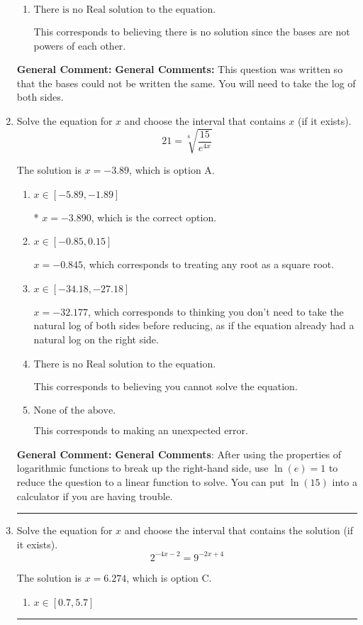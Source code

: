 \documentclass{extbook}[14pt]
\newcommand{\litem}[1]{\item #1

\rule{\textwidth}{0.4pt}}
\begin{document}
\begin{enumerate}
{\begin{enumerate}[label=\Alph*.]
$x = 0.811$, which corresponds to distributing the $\ln(base)$ to the first term of the exponent only.
\item \( \text{There is no Real solution to the equation.} \)

This corresponds to believing there is no solution since the bases are not powers of each other.
\end{enumerate}

\textbf{General Comment:} \textbf{General Comments:} This question was written so that the bases could not be written the same. You will need to take the log of both sides.
}
\litem{
 Solve the equation for $x$ and choose the interval that contains $x$ (if it exists).
\[  21 = \sqrt[6]{\frac{15}{e^{4x}}} \]

The solution is \( x = -3.89 \), which is option A.\begin{enumerate}[label=\Alph*.]
\item \( x \in [-5.89, -1.89] \)

* $x = -3.890$, which is the correct option.
\item \( x \in [-0.85, 0.15] \)

$x = -0.845$, which corresponds to treating any root as a square root.
\item \( x \in [-34.18, -27.18] \)

$x = -32.177$, which corresponds to thinking you don't need to take the natural log of both sides before reducing, as if the equation already had a natural log on the right side.
\item \( \text{There is no Real solution to the equation.} \)

This corresponds to believing you cannot solve the equation.
\item \( \text{None of the above.} \)

This corresponds to making an unexpected error.
\end{enumerate}

\textbf{General Comment:} \textbf{General Comments}: After using the properties of logarithmic functions to break up the right-hand side, use $\ln(e) = 1$ to reduce the question to a linear function to solve. You can put $\ln(15)$ into a calculator if you are having trouble.
}
\litem{
Solve the equation for $x$ and choose the interval that contains the solution (if it exists).
\[ 2^{-4x-2} = 9^{-2x+4} \]

The solution is \( x = 6.274 \), which is option C.\begin{enumerate}[label=\Alph*.]
\item \( x \in [0.7, 5.7] \)


\end{enumerate}}
\end{enumerate}
\end{document}
